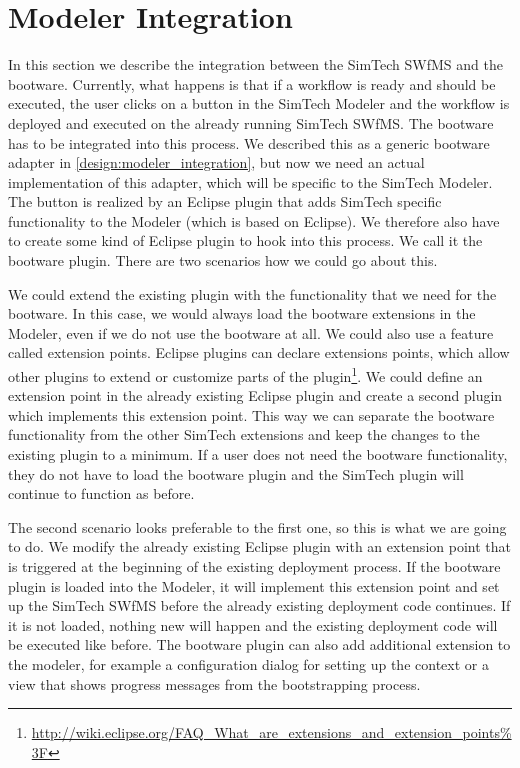\section{Modeler Integration}
\label{implementation:modeler_integration}

In this section we describe the integration between the SimTech SWfMS and the bootware.
Currently, what happens is that if a workflow is ready and should be executed, the user clicks on a button in the SimTech Modeler and the workflow is deployed and executed on the already running SimTech SWfMS.
The bootware has to be integrated into this process.
We described this as a generic bootware adapter in \autoref{design:modeler_integration}, but now we need an actual implementation of this adapter, which will be specific to the SimTech Modeler.
The button is realized by an Eclipse plugin that adds SimTech specific functionality to the Modeler (which is based on Eclipse).
We therefore also have to create some kind of Eclipse plugin to hook into this process.
We call it the bootware plugin.
There are two scenarios how we could go about this.

We could extend the existing plugin with the functionality that we need for the bootware.
In this case, we would always load the bootware extensions in the Modeler, even if we do not use the bootware at all.
We could also use a feature called extension points.
Eclipse plugins can declare extensions points, which allow other plugins to extend or customize parts of the plugin\footnote{\url{http://wiki.eclipse.org/FAQ_What_are_extensions_and_extension_points\%3F}}.
We could define an extension point in the already existing Eclipse plugin and create a second plugin which implements this extension point.
This way we can separate the bootware functionality from the other SimTech extensions and keep the changes to the existing plugin to a minimum.
If a user does not need the bootware functionality, they do not have to load the bootware plugin and the SimTech plugin will continue to function as before.

The second scenario looks preferable to the first one, so this is what we are going to do.
We modify the already existing Eclipse plugin with an extension point that is triggered at the beginning of the existing deployment process.
If the bootware plugin is loaded into the Modeler, it will implement this extension point and set up the SimTech SWfMS before the already existing deployment code continues.
If it is not loaded, nothing new will happen and the existing deployment code will be executed like before.
The bootware plugin can also add additional extension to the modeler, for example a configuration dialog for setting up the context or a view that shows progress messages from the bootstrapping process.

